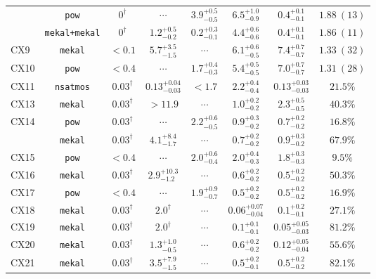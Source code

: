 \documentclass[fleqn,usenatbib]{mnras}
\newcommand\nodata{ ~$\cdots$~ }%
\newcommand{\nd}{\nodata}
\begin{document}
\begin{table*}
\begin{tabular}{lccccccc}
                               & {\tt pow}   & $0^\dag$ & \nd & $3.9^{+0.5}_{-0.5}$ & $6.5^{+1.0}_{-0.9}$ & $0.4^{+0.1}_{-0.1}$ & $1.88~(13)$ \\
                               & {\tt mekal+mekal} & $0^\dag$ & $1.2^{+0.5}_{-0.2}$ & $0.2^{+0.3}_{-0.1}$ & $4.4^{+0.6}_{-0.6}$ & $0.4^{+0.1}_{-0.1}$ & $1.86~(11)$\\
    \hline
      CX9    & {\tt mekal} & $<0.1$ & $5.7^{+3.5}_{-1.5}$ & \nd & $6.1^{+0.6}_{-0.5}$ & $7.4^{+0.7}_{-0.7}$ & $1.33~(32)$ \\
      CX10   & {\tt pow}   & $<0.4$ & \nd & $1.7^{+0.4}_{-0.3}$ & $5.4^{+0.5}_{-0.5}$ & $7.0^{+0.7}_{-0.7}$ & $1.31~(28)$ \\
      CX11   & {\tt nsatmos} & $0.03^\dag$ & $0.13^{+0.04}_{-0.03}$ & $<1.7$ & $2.2^{+0.4}_{-0.4}$ & $0.13^{+0.03}_{-0.03}$ & $21.5\%$ \\
      CX13   & {\tt mekal}   & $0.03^\dag$ & $>11.9$ & \nd & $1.0^{+0.2}_{-0.2}$ & $2.3^{+0.5}_{-0.5}$ & $40.3\%$ \\
      \hline
      \multirow{2}{*}{CX14} & {\tt pow}   & $0.03^\dag$ & \nd & $2.2^{+0.6}_{-0.5}$ & $0.9^{+0.3}_{-0.2}$ & $0.7^{+0.2}_{-0.2}$ & $16.8\%$ \\
                            & {\tt mekal} & $0.03^\dag$ & $4.1^{+8.4}_{-1.7}$ & \nd & $0.7^{+0.2}_{-0.2}$ & $0.9^{+0.3}_{-0.2}$ & $67.9\%$ \\
      \hline
      CX15   & {\tt pow} & $<0.4$ & \nd & $2.0^{+0.6}_{-0.4}$ & $2.0^{+0.4}_{-0.3}$ & $1.8^{+0.3}_{-0.3}$ & $9.5\%$\\
      CX16   & {\tt mekal} & $0.03^\dag$ & $2.9^{+10.3}_{-1.2}$ & \nd & $0.6^{+0.2}_{-0.2}$ & $0.5^{+0.2}_{-0.2}$ & $50.3\%$ \\
      CX17   & {\tt pow}  & $<0.4$ & \nd & $1.9^{+0.9}_{-0.7}$ & $0.5^{+0.2}_{-0.2}$ & $0.5^{+0.2}_{-0.2}$ & $16.9\%$ \\
      CX18   & {\tt mekal}  & $0.03^\dag$ & $2.0^\dag$ & \nd & $0.06^{+0.07}_{-0.04}$ & $0.1^{+0.2}_{-0.1}$ & $27.1\%$ \\
      CX19   & {\tt mekal}  & $0.03^\dag$ & $2.0^\dag$ & \nd & $0.1^{+0.1}_{-0.1}$ & $0.05^{+0.05}_{-0.03}$ & $81.2\%$ \\
      CX20   & {\tt mekal} & $0.03^\dag$ & $1.3^{+1.0}_{-0.5}$ & \nd & $0.6^{+0.2}_{-0.2}$ & $0.12^{+0.05}_{-0.04}$ & $55.6\%$ \\
      CX21   & {\tt mekal} & $0.03^\dag$ & $3.5^{+7.9}_{-1.5}$ & \nd & $0.5^{+0.2}_{-0.1}$ & $0.5^{+0.2}_{-0.2}$ & $82.1\%$ \\

\end{tabular}
\end{table*}
\end{document}
